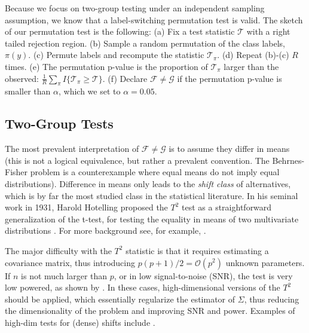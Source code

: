 \documentclass[oupdraft]{bio}
\begin{document}
Because we focus on two-group testing under an independent sampling assumption, we know that a label-switching permutation test is valid. 
The sketch of our permutation test is the following: \newline
(a) Fix a test statistic $\mathcal{T}$ with a right tailed rejection region. \newline
(b) Sample a random permutation of the class labels, $\pi(y)$. \newline
(c) Permute labels and recompute the statistic $\mathcal{T}_\pi$. \newline
(d) Repeat (b)-(c) $R$ times. \newline
(e) The permutation p-value is the proportion of  $\mathcal{T}_\pi$ larger than the observed: 
$\frac{1}{R} \sum_{\pi} I\{\mathcal{T}_\pi \geq \mathcal{T}\}$.\newline
(f) Declare $\mathcal{F}\neq \mathcal{G}$ if the permutation p-value is smaller than $\alpha$, which we set to $\alpha=0.05$.
\bigskip



\subsection{Two-Group Tests}
The most prevalent interpretation of $\mathcal{F}\neq \mathcal{G}$ is to assume they differ in means (this is not a logical equivalence, but rather a prevalent convention. The Behrnes-Fisher problem is a counterexample where equal means do not imply equal distributions). 
Difference in means only leads to the \emph{shift class} of alternatives, which is by far the most studied class in the statistical literature. 
In his seminal work in 1931, Harold Hotelling proposed the $T^2$ test as a straightforward generalization of the t-test, for testing the equality in means of two multivariate distributions \citep{hotelling_generalization_1931}. 
For more background see, for example, \cite{anderson_introduction_2003}.

The major difficulty with the $T^2$ statistic is that it requires estimating a covariance matrix, thus introducing $p(p+1)/2=\mathcal{O}(p^2)$ unknown parameters.
If $n$ is not much larger than $p$, or in low signal-to-noise (SNR), the test is very low powered, as shown by \cite{bai1996effect}. 
In these cases, high-dimensional versions of the $T^2$ should be applied, which essentially regularize the estimator of $\Sigma$, thus reducing the dimensionality of the problem and improving SNR and power.
Examples of high-dim tests for (dense) shifts include 
\cite{dempster1958high,bai1996effect,schafer_shrinkage_2005,goeman2006testing,srivastava_test_2008,chen_two-sample_2010,lopes2011more,ahmad2014u,thulin2014high,feng2015note}.
\end{document}
